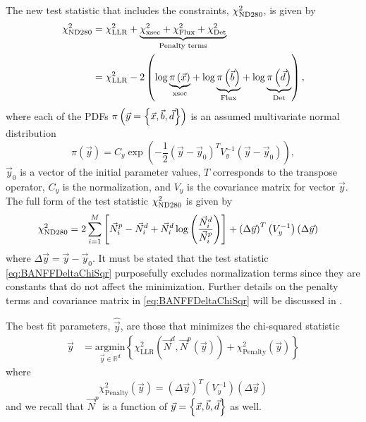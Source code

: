 The new test statistic that includes the constraints, $\chi_{\text{ND}280}^{2}$,
is given by
\begin{equation}
\begin{aligned}\chi_{\text{ND}280}^{2} & =\chi_{\text{LLR}}^{2}+\underset{\text{Penalty terms}}{\underbrace{\chi_{\text{xsec}}^{2}+\chi_{\text{Flux}}^{2}+\chi_{\text{Det}}^{2}}}\\
 & =\chi_{\text{LLR}}^{2}-2\left(\log\underset{\text{xsec}}{\underbrace{\pi\left(\vec{x}\right)}}+\log\underset{\text{Flux}}{\underbrace{\pi\left(\vec{b}\right)}}+\log\underset{\text{Det}}{\underbrace{\pi\left(\vec{d}\right)}}\right),
\end{aligned}
\label{eq:LLHRatioWithPenaltyTerms}
\end{equation}
where each of the PDFs $\pi\left(\vec{y}=\left\{ \vec{x},\vec{b},\vec{d}\right\} \right)$
is an assumed multivariate normal distribution
\begin{equation}
\pi(\vec{y})=C_{y}\exp\left(-\frac{1}{2}\left(\vec{y}-\vec{y}_{0}\right)^{T}V_{y}^{-1}\left(\vec{y}-\vec{y}_{0}\right)\right),\label{eq:nuisancepriorgaussian}
\end{equation}
$\vec{y}_{0}$ is a vector of the initial parameter values, $T$ corresponds
to the transpose operator, $C_{y}$ is the normalization, and $V_{y}$
is the covariance matrix for vector $\vec{y}$. The full form of the
test statistic $\chi_{\text{ND}280}^{2}$ is given by
\begin{equation}
\begin{aligned}\chi_{\text{ND}280}^{2} & =2\sum_{i=1}^{M}\left[\vec{N}_{i}^{p}-\vec{N}_{i}^{d}+\vec{N}_{i}^{d}\log\left(\frac{\vec{N}_{i}^{d}}{\vec{N}_{i}^{p}}\right)\right]+\left(\Delta\vec{y}\right)^{T}\left(V_{y}^{-1}\right)\left(\Delta\vec{y}\right)\end{aligned}
\label{eq:BANFFDeltaChiSqr}
\end{equation}
where $\Delta\vec{y}=\vec{y}-\vec{y}_{0}$. It must be stated that
the test statistic \eqref{eq:BANFFDeltaChiSqr} purposefully excludes
normalization terms since they are constants that do not affect the
minimization. Further details on the penalty terms and covariance
matrix in \eqref{eq:BANFFDeltaChiSqr} will be discussed in .

The best fit parameters, $\hat{\vec{y}}$, are those that minimizes
the chi-squared statistic
\begin{equation}
\begin{aligned}\hat{\vec{y}} & =\underset{\vec{y}\in\mathbb{R}^{d}}{\text{argmin}}\left\{ \chi_{\text{LLR}}^{2}\left(\vec{N}^{d},\vec{N}^{p}\left(\vec{y}\right)\right)+\chi_{\text{Penalty}}^{2}\left(\vec{y}\right)\right\} \end{aligned}
\label{eq:minBANFFDeltaChiSqr}
\end{equation}
where
\[
\chi_{\text{Penalty}}^{2}\left(\vec{y}\right)=\left(\Delta\vec{y}\right)^{T}\left(V_{y}^{-1}\right)\left(\Delta\vec{y}\right)
\]
and we recall that $\vec{N}^{p}$ is a function of $\vec{y}=\left\{ \vec{x},\vec{b},\vec{d}\right\} $
as well.

